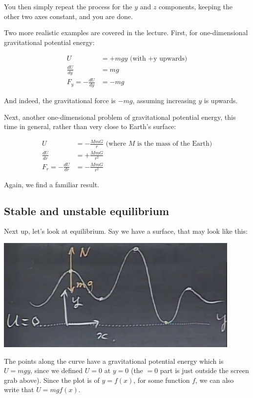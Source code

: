 \documentclass[8.01x]{subfiles}
\begin{document}
You then simply repeat the process for the $y$ and $z$ components, keeping the other two axes constant, and you are done.

Two more realistic examples are covered in the lecture. First, for one-dimensional gravitational potential energy:

\begin{align}
U &= + m g y \text{ (with +y upwards)}\\
\frac{dU}{dy} &= m g\\
F_y = -\frac{dU}{dy} &= - mg
\end{align}

And indeed, the gravitational force is $- m g$, assuming increasing $y$ is upwards.

Next, another one-dimensional problem of gravitational potential energy, this time in general, rather than very close to Earth's surface:

\begin{align}
U &= -\frac{M m G}{r} \text{ (where $M$ is the mass of the Earth)}\\
\frac{dU}{dr} &= +\frac{M m G}{r^2}\\
F_r = -\frac{dU}{dr} &= -\frac{M m G}{r^2}
\end{align}

Again, we find a familiar result.

\subsection{Stable and unstable equilibrium}

Next up, let's look at equilibrium. Say we have a surface, that may look like this:

\begin{center}
\includegraphics[scale=0.8]{Graphics/lec13_equilibrium}
\end{center}

The points along the curve have a gravitational potential energy which is $U = m g y$, since we defined $U = 0$ at $y = 0$ (the $= 0$ part is just outside the screen grab above). Since the plot is of $y = f(x)$, for some function $f$, we can also write that $U = m g f(x)$.
\end{document}
